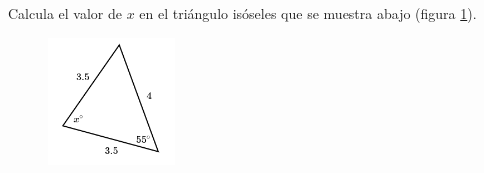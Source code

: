 \question[15]  Calcula el valor de $x$ en el triángulo isóseles  que se muestra abajo (figura \ref{fig:findangle05}).
\begin{figure}[H]
    \begin{center}
        \includegraphics[width=0.3\textwidth]{../images/findangle05.png}
    \end{center}
    \caption{}
    \label{fig:findangle05}
\end{figure}